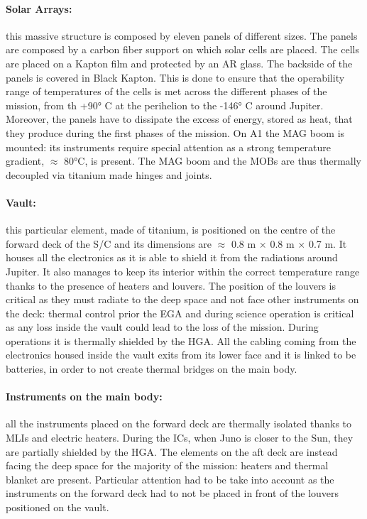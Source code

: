 \vspace{-4mm}

\paragraph{Solar Arrays:} this massive structure is composed by eleven panels of different sizes. The panels are composed by a carbon fiber support on which solar cells are placed. The cells are placed on a Kapton film and protected by an AR glass. The backside of the panels is covered in Black Kapton. This is done to ensure that the operability range of temperatures of the cells is met across the different phases of the mission, from th +90° C at the perihelion to the -146° C around Jupiter. Moreover, the panels have to dissipate the excess of energy, stored as heat, that they produce during the first phases of the mission. On A1 the MAG boom is mounted: its instruments require special attention as a strong temperature gradient,  $\approx$ 80°C, is present.
The MAG boom and the MOBs are thus thermally decoupled via titanium made hinges and joints.

\vspace{-4mm}

\paragraph{Vault:}this particular element, made of titanium, is positioned on the centre of the forward deck of the S/C and its dimensions are  $\approx$ 0.8 m $\times$ 0.8 m $\times$ 0.7 m. It houses all the electronics as it is able to shield it from the radiations around Jupiter. It also manages to keep its interior within the correct temperature range thanks to the presence of heaters and louvers. The position of the louvers is critical as they must radiate to the deep space and not face other instruments on the deck: thermal control prior the EGA and during science operation is critical as any loss inside the vault could lead to the loss of the mission. During operations it is thermally shielded by the HGA. All the cabling coming from the electronics housed inside the vault exits from its lower face and it is linked to be batteries, in order to not create thermal bridges on the main body.

\vspace{-4mm}

\paragraph{Instruments on the main body:} all the instruments placed on the forward deck are thermally isolated thanks to MLIs and electric heaters. During the ICs, when Juno is closer to the Sun, they are partially shielded by the HGA. The elements on the aft deck are instead facing the deep space for the majority of the mission: heaters and thermal blanket are present. Particular attention had to be take into account as the instruments on the forward deck had to not be placed in front of the louvers positioned on the vault. 

